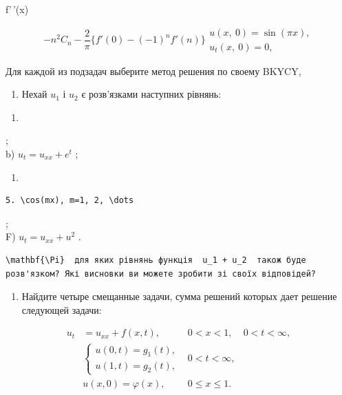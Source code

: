 \documentclass[
  ukrainian,
]{article}
\providecommand{\tightlist}{%
  \setlength{\itemsep}{0pt}\setlength{\parskip}{0pt}}
\begin{document}
f'\,'(x)

\[
-n^{2}C_{n} - \frac{2}{\pi} \{f'(0) - (-1)^{n} f'(n)\}
\begin{array}{ll} u\left(x, \ 0\right) = \sin{(\pi x)}, \\ u_{t}\left(x, \ 0\right) = 0, \end{array}
\]

Для каждой из подзадач выберите метод решения по своему BKYCY,

\begin{enumerate}
\def\labelenumi{\arabic{enumi}.}
\setcounter{enumi}{2}
\tightlist
\item
  Нехай \(u_1\) і \(u_2\) є розв'язками наступних рівнянь:
\end{enumerate}

\begin{enumerate}
\def\labelenumi{\alph{enumi})}
\tightlist
\item
\end{enumerate}

;\\
b) \(u_t = u_{xx} + e^t\) ;

\begin{enumerate}
\def\labelenumi{\Alph{enumi})}
\setcounter{enumi}{1}
\tightlist
\item
\end{enumerate}

\begin{verbatim}
5. \cos(mx), m=1, 2, \dots
\end{verbatim}

;\\
F) \(u_t = u_{xx} + u^2\) .

\begin{verbatim}
\mathbf{\Pi}  для яких рівнянь функція  u_1 + u_2  також буде розв'язком? Які висновки ви можете зробити зі своїх відповідей?
\end{verbatim}

\begin{enumerate}
\def\labelenumi{\arabic{enumi}.}
\setcounter{enumi}{3}
\tightlist
\item
  Найдите четыре смещанные задачи, сумма решений которых дает решение
  следующей задачи:
\end{enumerate}

\[
\begin{aligned} u_t &= u_{xx} + f(x, t), & 0 < x < 1, & 0 < t < \infty, \\ & \begin{cases} u(0, t) = g_1(t), \\ u(1, t) = g_2(t), \end{cases} & 0 < t < \infty, \\ & u(x, 0) = \varphi(x), & 0 \le x \le 1. \end{aligned}
\]
\end{document}
